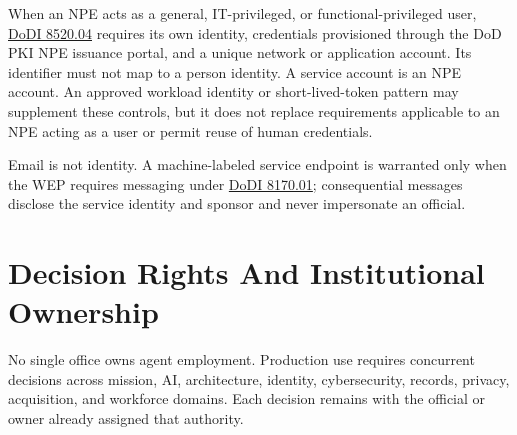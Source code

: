 \documentclass[11pt]{article}
\begin{document}
When an NPE acts as a general, IT-privileged, or functional-privileged
user,
\href{https://www.esd.whs.mil/Portals/54/Documents/DD/issuances/dodi/852004p.pdf}{DoDI
8520.04} requires its own identity, credentials provisioned through the
DoD PKI NPE issuance portal, and a unique network or application
account. Its identifier must not map to a person identity. A service
account is an NPE account. An approved workload identity or
short-lived-token pattern may supplement these controls, but it does not
replace requirements applicable to an NPE acting as a user or permit
reuse of human credentials.

Email is not identity. A machine-labeled service endpoint is warranted
only when the WEP requires messaging under
\href{https://www.esd.whs.mil/Portals/54/Documents/DD/issuances/dodi/817001p.pdf}{DoDI
8170.01}; consequential messages disclose the service identity and
sponsor and never impersonate an official.

\hypertarget{7-decision-rights-and-institutional-ownership}{%
\section{Decision Rights And Institutional
Ownership}\label{7-decision-rights-and-institutional-ownership}}

No single office owns agent employment. Production use requires
concurrent decisions across mission, AI, architecture, identity,
cybersecurity, records, privacy, acquisition, and workforce domains.
Each decision remains with the official or owner already assigned that
authority.
\end{document}
